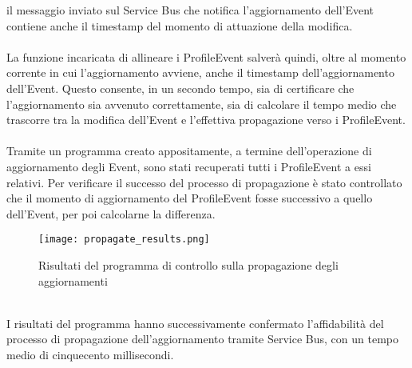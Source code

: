 il messaggio inviato sul Service Bus che notifica l'aggiornamento dell'Event 
contiene anche il timestamp del momento di attuazione della modifica.\\
\\
La funzione incaricata di allineare i ProfileEvent
salverà quindi, oltre al momento corrente in cui l'aggiornamento avviene,
anche il timestamp dell'aggiornamento dell'Event.
Questo consente, in un secondo tempo, 
sia di certificare che l'aggiornamento sia avvenuto correttamente, 
sia di calcolare il tempo medio che trascorre tra la modifica dell'Event 
e l'effettiva propagazione verso i ProfileEvent.\\
\\
Tramite un programma creato appositamente, 
a termine dell'operazione di aggiornamento degli Event,
sono stati recuperati tutti i ProfileEvent a essi relativi.
Per verificare il successo del processo di propagazione 
è stato controllato che il momento di aggiornamento del ProfileEvent 
fosse successivo a quello dell'Event, 
per poi calcolarne la differenza.\\
\begin{figure}[htbp]
    \begin{center}
        \texttt{[image: propagate\_results.png]}
        \caption{Risultati del programma di controllo sulla propagazione degli aggiornamenti}
    \end{center}
\end{figure}
\\
I risultati del programma hanno successivamente confermato l'affidabilità 
del processo di propagazione dell'aggiornamento tramite Service Bus, 
con un tempo medio di cinquecento millisecondi. 
\clearpage
